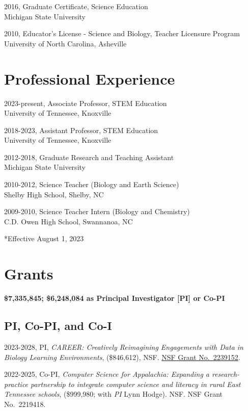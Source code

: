 \documentclass[
  14,
]{article}
\begin{document}
2016, Graduate Certificate, Science Education\\
Michigan State University

2010, Educator's License - Science and Biology, Teacher Licensure
Program\\
University of North Carolina, Asheville

\hypertarget{professional-experience}{%
\section{Professional Experience}\label{professional-experience}}

2023-present, Associate Professor, STEM Education\\
University of Tennessee, Knoxville

2018-2023, Assistant Professor, STEM Education\\
University of Tennessee, Knoxville

2012-2018, Graduate Research and Teaching Assistant\\
Michigan State University

2010-2012, Science Teacher (Biology and Earth Science)\\
Shelby High School, Shelby, NC

2009-2010, Science Teacher Intern (Biology and Chemistry)\\
C.D. Owen High School, Swannanoa, NC

*Effective August 1, 2023

\hypertarget{grants}{%
\section{Grants}\label{grants}}

\textbf{\$7,335,845; \$6,248,084 as Principal Investigator {[}PI{]} or
Co-PI}

\hypertarget{pi-co-pi-and-co-i}{%
\subsection{PI, Co-PI, and Co-I}\label{pi-co-pi-and-co-i}}

2023-2028, PI, \emph{CAREER: Creatively Reimagining Engagements with
Data in Biology Learning Environments}, (\$846,612), NSF.
\href{https://www.nsf.gov/awardsearch/showAward?AWD_ID=2239152\&HistoricalAwards=false}{NSF
Grant No.~2239152}.

2022-2025, Co-PI, \emph{Computer Science for Appalachia: Expanding a
research-practice partnership to integrate computer science and literacy
in rural East Tennessee schools}, (\$999,980; with \emph{PI} Lynn
Hodge). NSF. NSF Grant No.~2219418.
\end{document}
